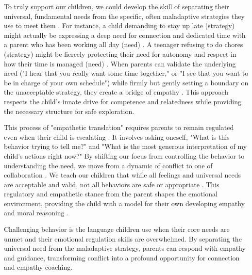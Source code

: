 To truly support our children, we could develop the skill of separating their universal, fundamental needs from the specific, often maladaptive strategies they use to meet them \citep{gordon1970, deci2000, ryan2017}.
For instance, a child demanding to stay up late (strategy) might actually be expressing a deep need for connection and dedicated time with a parent who has been working all day (need) \citep{white1959, erikson1950}.
A teenager refusing to do chores (strategy) might be fiercely protecting their need for autonomy and respect in how their time is managed (need) \citep{patall2008, grolnick1989}.
When parents can validate the underlying need ("I hear that you really want some time together," or "I see that you want to be in charge of your own schedule") while firmly but gently setting a boundary on the unacceptable strategy, they create a bridge of empathy \citep{faber1980, hrdy2009, trevarthen1979}.
This approach respects the child's innate drive for competence and relatedness while providing the necessary structure for safe exploration.

This process of "empathetic translation" requires parents to remain regulated even when their child is escalating \citep{porges2011, siegel2003}.
It involves asking oneself, "What is this behavior trying to tell me?" and "What is the most generous interpretation of my child's actions right now?"
By shifting our focus from controlling the behavior to understanding the need, we move from a dynamic of conflict to one of collaboration \citep{cohen2001, rizzolatti2004, decety2021}.
We teach our children that while all feelings and universal needs are acceptable and valid, not all behaviors are safe or appropriate \citep{ekman1992, hoffman2000, dunn2000}.
This regulatory and empathetic stance from the parent shapes the emotional environment, providing the child with a model for their own developing empathy and moral reasoning \citep{lobue2022, howard2024, damasio1994}.

\begin{keyinsight}
Challenging behavior is the language children use when their core needs are unmet and their emotional regulation skills are overwhelmed.
By separating the universal need from the maladaptive strategy, parents can respond with empathy and guidance, transforming conflict into a profound opportunity for connection and empathy coaching.
\end{keyinsight}
\newpage
